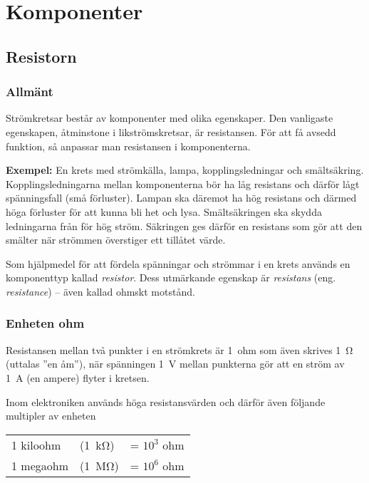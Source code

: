 \chapter{Komponenter}
\label{komponenter}

\section{Resistorn}

\subsection{Allmänt}

Strömkretsar består av komponenter med olika egenskaper.
Den vanligaste egenskapen, åtminstone i likströmskretsar, är resistansen.
För att få avsedd funktion, så anpassar man resistansen i komponenterna.

\textbf{Exempel:} En krets med strömkälla, lampa, kopplingsledningar och smältsäkring.
Kopplingsledningarna mellan komponenterna bör ha låg resistans och därför lågt
spänningsfall (små förluster).
Lampan ska däremot ha hög resistans och därmed höga förluster för att kunna bli
het och lysa.
Smältsäkringen ska skydda ledningarna från för hög ström.
Säkringen ges därför en resistans som gör att den smälter när strömmen
överstiger ett tillåtet värde.

Som hjälpmedel för att fördela spänningar och strömmar i en krets används
en komponenttyp kallad \emph{resistor}.
Dess utmärkande egenskap är \emph{resistans} (eng. \emph{resistance}) --
även kallad ohmskt motstånd.

\subsection{Enheten ohm}


Resistansen mellan två punkter i en strömkrets är 1~ohm som även skrives
\SI{1}{\ohm} (uttalas ''en åm''), när spänningen \SI{1}{\volt} mellan punkterna
gör att en ström av \SI{1}{\ampere} (en ampere) flyter i kretsen.

Inom elektroniken används höga resistansvärden och därför även följande
multipler av enheten

\begin{center}
\begin{tabular}{lll}
  1 kiloohm & (\SI{1}{\kilo\ohm}) & = \(10^3\) ohm \\
  1 megaohm & (\SI{1}{\mega\ohm}) & = \(10^6\) ohm \\
\end{tabular}
\end{center}

